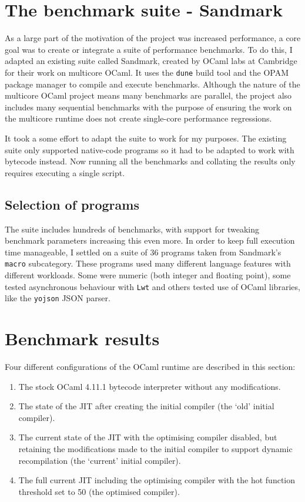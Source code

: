 \section{The benchmark suite - Sandmark}

As a large part of the motivation of the project was increased performance, a core goal was to
create or integrate a suite of performance benchmarks. To do this, I adapted an existing suite
called Sandmark, created by OCaml labs at Cambridge for their work on
multicore OCaml. It uses the \texttt{dune} build tool and the OPAM package manager to compile and
execute benchmarks.
Although the nature of the multicore OCaml project means many benchmarks are parallel, the project
also includes many sequential benchmarks with the purpose of ensuring the work on the multicore
runtime does not create single-core performance regressions.

It took a some effort to adapt the suite to work for my purposes. The existing suite only
supported native-code programs so it had to be adapted to work with bytecode instead. Now running
all the benchmarks and collating the results only requires executing a single script.

\subsection{Selection of programs}

The suite includes hundreds of benchmarks, with support for tweaking benchmark parameters
increasing
this even more. In order to keep full execution time manageable, I settled on a suite of 36
programs taken from Sandmark's \texttt{macro} subcategory. These programs used many different
language features with different workloads. Some were numeric (both integer and floating point),
some tested asynchronous behaviour with \texttt{Lwt} and others tested use of OCaml libraries, like
the \texttt{yojson} JSON parser.

\section{Benchmark results}

Four different configurations of the OCaml runtime are described in this section:

\begin{enumerate}
      \item The stock OCaml 4.11.1 bytecode interpreter without any modifications.
      \item The state of the JIT after creating the initial compiler (the `old' initial compiler).
      \item The current state of the JIT with the optimising compiler disabled, but retaining
            the modifications made to the initial compiler to support dynamic recompilation (the
            `current' initial compiler).
      \item The full current JIT including the optimising compiler with the hot function threshold
            set to 50 (the optimised compiler).
\end{enumerate}


